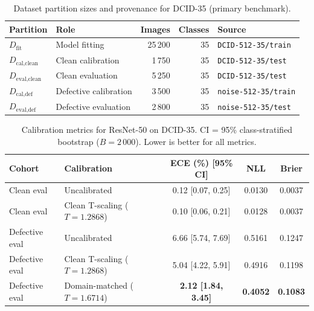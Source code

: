 \documentclass[5p,times,twocolumn]{elsarticle}
\begin{document}
\begin{table}[t]
  \centering
  \caption{Dataset partition sizes and provenance for DCID-35 (primary benchmark).}
  \label{tab:partitions}
  \begin{tabular}{llrrl}
    \toprule
    Partition & Role & Images & Classes & Source \\
    \midrule
    $D_{\text{fit}}$         & Model fitting    & 25\,200 & 35 & \texttt{DCID-512-35/train} \\
    $D_{\text{cal,clean}}$   & Clean calibration & 1\,750  & 35 & \texttt{DCID-512-35/test} \\
    $D_{\text{eval,clean}}$  & Clean evaluation  & 5\,250  & 35 & \texttt{DCID-512-35/test} \\
    $D_{\text{cal,def}}$     & Defective calibration & 3\,500 & 35 & \texttt{noise-512-35/train} \\
    $D_{\text{eval,def}}$    & Defective evaluation  & 2\,800 & 35 & \texttt{noise-512-35/test} \\
    \bottomrule
  \end{tabular}
\end{table}

\begin{table}[t]
  \centering
  \caption{Calibration metrics for ResNet-50 on DCID-35. CI = 95\% class-stratified
           bootstrap ($B=2\,000$). Lower is better for all metrics.}
  \label{tab:calibration}
  \begin{tabular}{llccc}
    \toprule
    Cohort & Calibration & ECE (\%) [95\% CI] & NLL & Brier \\
    \midrule
    Clean eval  & Uncalibrated & 0.12 [0.07, 0.25] & 0.0130 & 0.0037 \\
    Clean eval  & Clean T-scaling ($T=1.2868$) & 0.10 [0.06, 0.21] & 0.0128 & 0.0037 \\
    \midrule
    Defective eval & Uncalibrated & 6.66 [5.74, 7.69] & 0.5161 & 0.1247 \\
    Defective eval & Clean T-scaling ($T=1.2868$) & 5.04 [4.22, 5.91] & 0.4916 & 0.1198 \\
    Defective eval & Domain-matched ($T=1.6714$) & \textbf{2.12 [1.84, 3.45]} & \textbf{0.4052} & \textbf{0.1083} \\
    \bottomrule
  \end{tabular}
\end{table}
\end{document}

